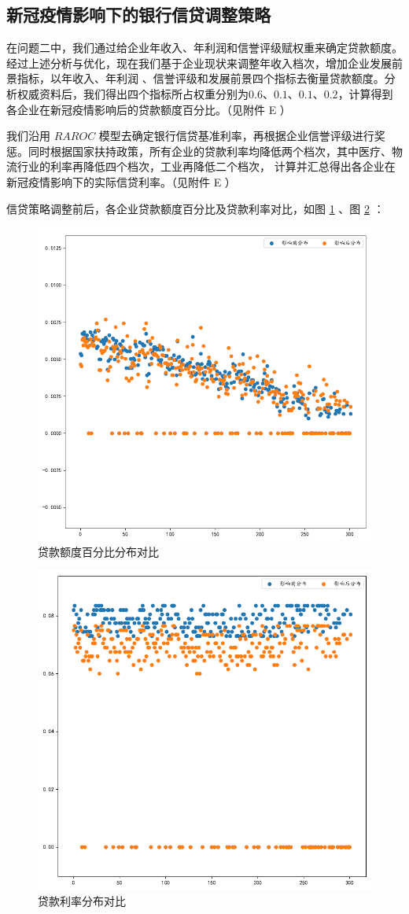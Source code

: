 \documentclass[withoutpreface,bwprint]{cumcmthesis}
\begin{document}
    \subsection{新冠疫情影响下的银行信贷调整策略}
        在问题二中，我们通过给企业年收入、年利润和信誉评级赋权重来确定贷款额度。经过上述分析与优化，现在我们基于企业现状来调整年收入档次，增加企业发展前景指标，以年收入、年利润
        、信誉评级和发展前景四个指标去衡量贷款额度。分析权威资料后，我们得出四个指标所占权重分别为$0.6$、$0.1$、$0.1$、$0.2$，计算得到各企业在新冠疫情影响后的贷款额度百分比。（见附件 E ）\par
        我们沿用 $RAROC$ 模型去确定银行信贷基准利率，再根据企业信誉评级进行奖惩。同时根据国家扶持政策，所有企业的贷款利率均降低两个档次，其中医疗、物流行业的利率再降低四个档次，工业再降低二个档次，
        计算并汇总得出各企业在新冠疫情影响下的实际信贷利率。（见附件 E ）\par
        信贷策略调整前后，各企业贷款额度百分比及贷款利率对比，如图 \ref{图：贷款额度百分比分布对比} 、图 \ref{图：贷款利率分布对比} ：
        \begin{figure}[H]
            \centering
            \includegraphics[width = 0.6 \textwidth]{com_1.png}
            \caption{贷款额度百分比分布对比}
            \label {图：贷款额度百分比分布对比}
        \end{figure}
        \begin{figure}[H]
            \centering
            \includegraphics[width = 0.6 \textwidth]{com_2.png}
            \caption{贷款利率分布对比}
            \label {图：贷款利率分布对比}
        \end{figure}
    
\end{document}
